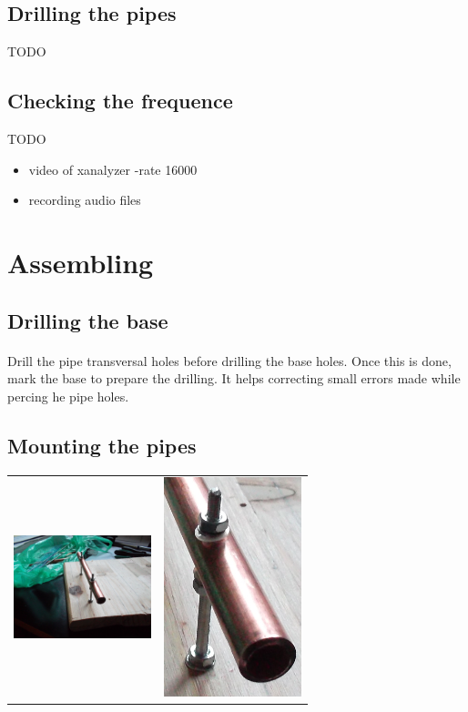 \documentclass[12pt]{article}
\begin{document}
\subsection{Drilling the pipes}
TODO

\subsection{Checking the frequence}
TODO
\begin{itemize}
  \item video of xanalyzer -rate 16000
  \item recording audio files
\end{itemize}

\newpage
\section{Assembling}

\subsection{Drilling the base}
\paragraph{} Drill the pipe transversal holes before drilling the base holes. Once this is
done, mark the base to prepare the drilling. It helps correcting small errors made while
percing  he pipe holes.

\subsection{Mounting the pipes}
\begin{center}
  \begin{tabular}{c|c}
    \includegraphics[keepaspectratio=true, width=40mm]{../pics/assembly/mounted_pipe_scaled.jpg} &
    \includegraphics[keepaspectratio=true, width=40mm]{../pics/assembly/mounted_pipe_cropped.jpg}
  \end{tabular}
\end{center}
\end{document}
